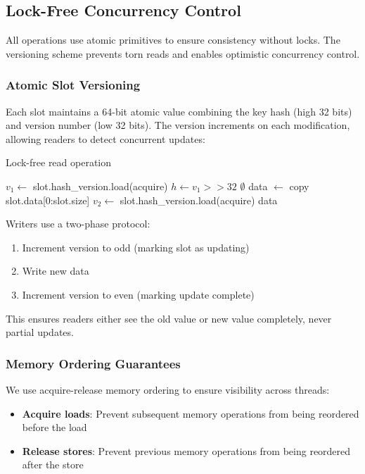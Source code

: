 \documentclass[10pt,conference]{IEEEtran}
\begin{document}
\subsection{Lock-Free Concurrency Control}

All operations use atomic primitives to ensure consistency without locks. The versioning scheme prevents torn reads and enables optimistic concurrency control.

\subsubsection{Atomic Slot Versioning}
Each slot maintains a 64-bit atomic value combining the key hash (high 32 bits) and version number (low 32 bits). The version increments on each modification, allowing readers to detect concurrent updates:

\begin{algorithm}
\caption{Lock-free read operation}
\label{alg:read}
\begin{algorithmic}[1]
\REPEAT
\STATE $v_1 \gets$ slot.hash\_version.load(acquire)
\STATE $h \gets v_1 >> 32$ 
\RETURN $\emptyset$ 
\ENDIF
\STATE data $\gets$ copy slot.data[0:slot.size]
\STATE $v_2 \gets$ slot.hash\_version.load(acquire)
 
\RETURN data
\end{algorithmic}
\end{algorithm}

Writers use a two-phase protocol:
\begin{enumerate}
\item Increment version to odd (marking slot as updating)
\item Write new data
\item Increment version to even (marking update complete)
\end{enumerate}

This ensures readers either see the old value or new value completely, never partial updates.

\subsubsection{Memory Ordering Guarantees}
We use acquire-release memory ordering to ensure visibility across threads:
\begin{itemize}
\item \textbf{Acquire loads}: Prevent subsequent memory operations from being reordered before the load
\item \textbf{Release stores}: Prevent previous memory operations from being reordered after the store
\end{itemize}
\end{document}
